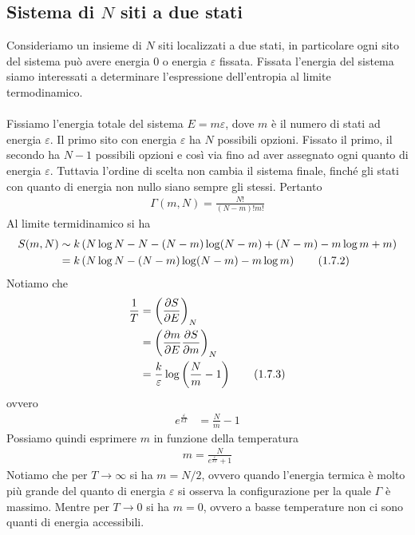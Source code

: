 \documentclass{article}
\begin{document}
\subsection{Sistema di $N$ siti a due stati}
Consideriamo un insieme di $N$ siti localizzati a due stati, in particolare ogni sito del sistema può avere energia $0$ o energia $\varepsilon$ fissata. Fissata l'energia del sistema siamo interessati a determinare l'espressione dell'entropia al limite termodinamico. \\ \\
Fissiamo l'energia totale del sistema $E = m\varepsilon$, dove $m$ è il numero di stati ad energia $\varepsilon$. Il primo sito con energia $\varepsilon$ ha $N$ possibili opzioni. Fissato il primo, il secondo ha $N - 1$ possibili opzioni e così via fino ad aver assegnato ogni quanto di energia $\varepsilon$. Tuttavia l'ordine di scelta non cambia il sistema finale, finché gli stati con quanto di energia non nullo siano sempre gli stessi. Pertanto
\begin{align}
    \Gamma(m, N) = \frac{N!}{(N - m)!m!} \tag{1.7.1}
\end{align}
Al limite termidinamico si ha 
\begin{align}
    S(m, N) &\sim k\left(N\log N - N - (N - m)\log(N - m) + (N - m) - m\log m + m\right) \notag \\
    &= k\left(N\log N - (N - m)\log(N - m) - m\log m\right) \tag{1.7.2}
\end{align}
Notiamo che 
\begin{align}
    \frac{1}{T} &= \left(\frac{\partial S}{\partial E}\right)_N \notag \\
    &= \left(\frac{\partial m}{\partial E}\frac{\partial S}{\partial m}\right)_N \notag \\
    &= \frac{k}{\varepsilon}\log 
    \left(\frac{N}{m} - 1\right) \tag{1.7.3}
\end{align}
ovvero 
\begin{align}
    e^{\frac{\varepsilon}{kT}} &= \frac{N}{m} - 1 \tag{1.7.4}
\end{align}
Possiamo quindi esprimere $m$ in funzione della temperatura 
\begin{align}
    m = \frac{N}{e^{\frac{\varepsilon}{kT}} + 1} \tag{1.7.5}
\end{align}
Notiamo che per $T \rightarrow \infty$ si ha $m = N/2$, ovvero quando l'energia termica è molto più grande del quanto di energia $\varepsilon$ si osserva la configurazione per la quale $\Gamma$ è massimo. Mentre per $T \rightarrow 0$ si ha $m = 0$, ovvero a basse temperature non ci sono quanti di energia accessibili.
\end{document}
